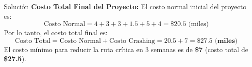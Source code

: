 \documentclass[11pt, a4paper]{article}
\begin{document}
\begin{ejercicio}{Solución}
  \textbf{Costo Total Final del Proyecto:}
  El costo normal inicial del proyecto es:
  \begin{equation*}
    \text{Costo Normal} = 4 + 3 + 3 + 1.5 + 5 + 4 = \$20.5 \text{ (miles)}
  \end{equation*}
  Por lo tanto, el costo total final es:
  \begin{equation*}
    \text{Costo Total} = \text{Costo Normal} + \text{Costo Crashing} = 20.5 + 7 = \mathbf{\$27.5 \text{ (miles)}}
  \end{equation*}
  El costo mínimo para reducir la ruta crítica en 3 semanas es de \textbf{\$7} (costo total de \textbf{\$27.5}).

\end{ejercicio}
\end{document}
